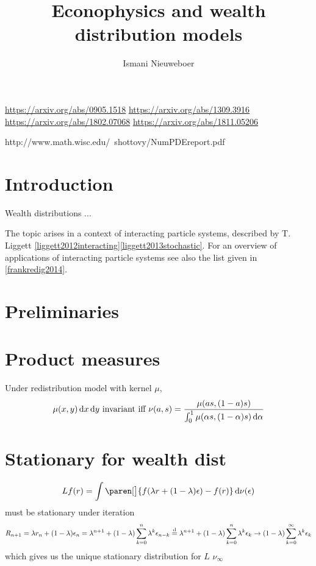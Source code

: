 \documentclass{article}
\title{Econophysics and wealth distribution models}
\author{Ismani Nieuweboer}
\begin{document}
\maketitle

\url{https://arxiv.org/abs/0905.1518}
\url{https://arxiv.org/abs/1309.3916}
\url{https://arxiv.org/abs/1802.07068}
\url{https://arxiv.org/abs/1811.05206}

http://www.math.wisc.edu/~shottovy/NumPDEreport.pdf





\section*{Introduction}
Wealth distributions ...

The topic arises in a context of interacting particle systems, described by T. Liggett \ref{liggett2012interacting}\ref{liggett2013stochastic}. For an overview of applications of interacting particle systems see also the list given in \ref{frankredig2014}.



\section{Preliminaries}


\section{Product measures}

Under redistribution model with kernel $\mu$,
\[
\mu(x, y) \mathop{}\!\mathrm{d} x \mathop{}\!\mathrm{d} y  \text{ invariant iff }
\nu(a, s) = \frac{ \mu(as, (1-a)s) }{\int_0^1 \mu(\alpha s, (1-\alpha)s) \mathop{}\!\mathrm{d} \alpha}
\]

\section{Stationary for wealth dist}

\[
Lf(r) = \int \paren[\big]{f(\lambda r + (1 - \lambda)\epsilon) - f(r) } \diff \nu(\epsilon)
\]
must be stationary under iteration
\[
R_{n+1} = \lambda r_n + (1-\lambda)\epsilon_n
\\= \lambda^{n+1} + (1-\lambda)\sum_{k=0}^n \lambda^{k} \epsilon_{n-k}
\\\overset{\mathop{}\!\mathrm{d}}{=} \lambda^{n+1} + (1-\lambda)\sum_{k=0}^n \lambda^{k} \epsilon_{k}
\to 
 (1-\lambda)\sum_{k=0}^{\infty} \lambda^{k} \epsilon_{k}
\]
which gives us the unique stationary distribution for $L$ $\nu_{\infty}$
\end{document}
